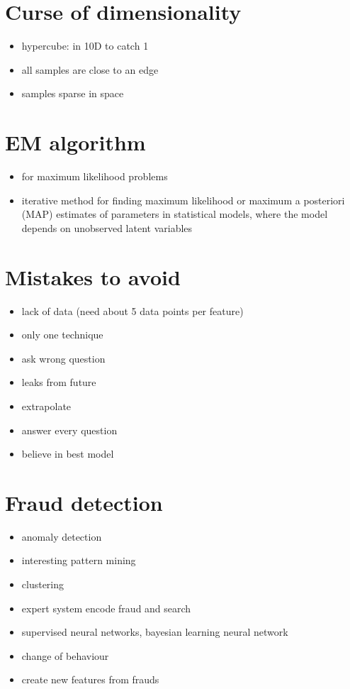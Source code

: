 \documentclass{article}
\begin{document}
\begin{multicols}{3}
\section{Curse of dimensionality}
\begin{itemize}
\item hypercube: in 10D to catch 1%
\item all samples are close to an edge
\item samples sparse in space
\end{itemize}

\section{EM algorithm}
\begin{itemize}
\item for maximum likelihood problems
\item  iterative method for finding maximum likelihood or maximum a posteriori (MAP) estimates of parameters in statistical models, where the model depends on unobserved latent variables
\end{itemize}

\section{Mistakes to avoid}
\begin{itemize}
\item lack of data (need about 5 data points per feature)
\item only one technique
\item ask wrong question
\item leaks from future
\item extrapolate
\item answer every question
\item believe in best model
\end{itemize}

\section{Fraud detection}
\begin{itemize}
\item anomaly detection
\item interesting pattern mining
\item clustering
\item expert system encode fraud and search
\item supervised neural networks, bayesian learning neural network
\item change of behaviour
\item create new features from frauds
\end{itemize}


\end{multicols}
\end{document}
